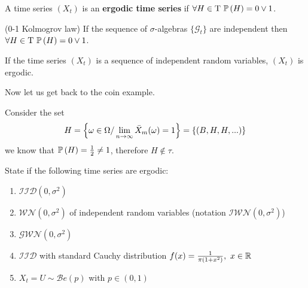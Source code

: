 \begin{definition}
    A time series $(X_t)$ is an \textbf{ergodic time series} if $\forall H\in\Tau\ \prob{H}=0 \vee 1$.
\end{definition}

\begin{remark}
    (0-1 Kolmogrov law) If the sequence of $\sigma$-algebras $\{\mathcal{G}_t\}$ are independent then $\forall H\in\Tau\ \prob{H}=0\vee1$. 
\end{remark}

\begin{lemma}
    If the time series $(X_t)$ is a sequence of independent random variables, $(X_t)$ is ergodic.
\end{lemma}

Now let us get back to the coin example.

\begin{example}
    Consider the set
    \[
        H=\left\{\omega\in\Omega/\lim_{n\to\infty}\bar{X}_m(\omega)=1\right\}=\{(B,H,H,...)\}  
    \]
    we know that $\mathbb{P}\left(H\right)=\frac{1}{2}\ne1$, therefore $H\notin\tau$.
\end{example}

\begin{exercise}
    State if the following time series are ergodic:
    \begin{enumerate}
        \item $\mathcal{IID}(0,\sigma^2)$
        \item $\mathcal{WN}(0,\sigma^2)$ of independent random variables (notation $\mathcal{IWN}(0,\sigma^2)$)
        \item $\mathcal{GWN}(0,\sigma^2)$
        \item $\mathcal{IID}$ with standard Cauchy distribution $f(x)=\frac{1}{\pi(1+x^2)},\ x\in\mathbb{R}$
        \item $X_t=U\sim\mathcal{B}e(p)$ with $p\in(0,1)$
    \end{enumerate}
\end{exercise}